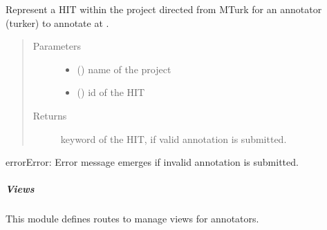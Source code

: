 \documentclass[a4paper,12pt,english]{sphinxmanual}
\begin{document}
\begin{fulllineitems}
\label{\detokenize{project_rst/annotator_rst/routes:project.annotator.annotation.hit}}
Represent a HIT within the project directed from MTurk for an annotator (turker)
to annotate at .
\begin{quote}\begin{description}
\item[{Parameters}] \leavevmode\begin{itemize}
\item {} 
 () \textendash{} name of the project

\item {} 
 () \textendash{} id of the HIT

\end{itemize}

\item[{Returns}] \leavevmode
keyword of the HIT, if valid annotation is submitted.

\end{description}\end{quote}

\begin{sphinxadmonition}{error}{Error:}
Error message emerges if invalid annotation is submitted.
\end{sphinxadmonition}

\end{fulllineitems}

\label{\detokenize{project_rst/annotator_rst/routes:module-project.annotator.views}}

\subparagraph{Views}
\label{\detokenize{project_rst/annotator_rst/routes:views}}
 

This module defines routes to manage views for annotators.
\end{document}
